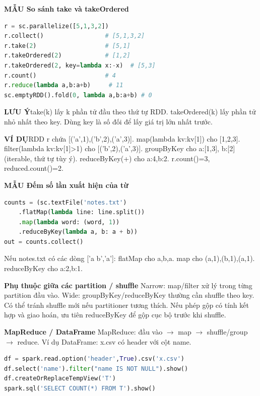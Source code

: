 \documentclass[a4paper]{article}
\newcommand{\bodyfontsize}{5.55}
\newcommand{\bodyleading}{5.2}
\newcommand{\bodylineskiplimit}{-2pt}
\newcommand{\bodystyle}{%
  \fontsize{\bodyfontsize}{\bodyleading}\selectfont\setlength{\lineskiplimit}{\bodylineskiplimit}\RaggedRight
  \setlength{\abovedisplayskip}{.5pt}\setlength{\belowdisplayskip}{.5pt}%
  \setlength{\abovedisplayshortskip}{.3pt}\setlength{\belowdisplayshortskip}{.3pt}}
\newenvironment{topicblock}
  {\par\bodystyle}
  {\par}
\newcommand{\key}[1]{\par\textcolor{structure}{\textbf{#1}}\enspace}
\newcommand{\note}[4]{\par\nointerlineskip\vspace{.25pt}\begingroup\setlength{\fboxsep}{0.1pt}%
  \noindent\colorbox{#1}{\parbox{\dimexpr\linewidth-2\fboxsep\relax}{%
    \RaggedRight\textcolor{#2}{\textbf{#3}}\enspace #4}}%
  \endgroup\par\nointerlineskip\vspace{.25pt}}
\newcommand{\trap}[1]{\note{warningbg}{warning}{LƯU Ý}{#1}}
\newcommand{\ex}[1]{\note{examplebg}{example}{VÍ DỤ}{#1}}
\newcommand{\pattern}[1]{\key{MẪU #1}}
\newlength{\sheetwidth}
\newenvironment{sheetcolumns}[1]
  {\noindent\begin{minipage}[t]{#1\sheetwidth}\vspace{0pt}\bodystyle\ignorespaces}
  {\end{minipage}\par}
\begin{document}
\begin{sheetcolumns}{.272}
\begin{topicblock}
\pattern{So sánh take và takeOrdered}
\begin{lstlisting}[style=Plaincode,language=Python]
r = sc.parallelize([5,1,3,2])
r.collect()                 # [5,1,3,2]
r.take(2)                   # [5,1]
r.takeOrdered(2)            # [1,2]
r.takeOrdered(2, key=lambda x:-x)  # [5,3]
r.count()                   # 4
r.reduce(lambda a,b:a+b)     # 11
sc.emptyRDD().fold(0, lambda a,b:a+b) # 0
\end{lstlisting}
\trap{take(k) lấy k phần tử đầu theo thứ tự RDD. takeOrdered(k) lấy phần tử nhỏ nhất theo key. Dùng key là số đối để lấy giá trị lớn nhất trước.}
\ex{RDD r chứa [('a',1),('b',2),('a',3)]. map(lambda kv:kv[1]) cho [1,2,3]. filter(lambda kv:kv[1]>1) cho [('b',2),('a',3)]. groupByKey cho a:[1,3], b:[2] (iterable, thứ tự tùy ý). reduceByKey(+) cho a:4,b:2. r.count()=3, reduced.count()=2.}
\pattern{Đếm số lần xuất hiện của từ}
\begin{lstlisting}[style=Plaincode,language=Python]
counts = (sc.textFile('notes.txt')
    .flatMap(lambda line: line.split())
    .map(lambda word: (word, 1))
    .reduceByKey(lambda a, b: a + b))
out = counts.collect()
\end{lstlisting}
Nếu notes.txt có các dòng ['a b','a']: flatMap cho a,b,a. map cho (a,1),(b,1),(a,1). reduceByKey cho a:2,b:1.
\key{Phụ thuộc giữa các partition / shuffle}
Narrow: map/filter xử lý trong từng partition đầu vào. Wide: groupByKey/reduceByKey thường cần shuffle theo key. Có thể tránh shuffle mới nếu partitioner tương thích. Nếu phép gộp có tính kết hợp và giao hoán, ưu tiên reduceByKey để gộp cục bộ trước khi shuffle.
\key{MapReduce / DataFrame}
MapReduce: đầu vào $\to$ map $\to$ shuffle/group $\to$ reduce. Ví dụ DataFrame: x.csv có header với cột name.
\begin{lstlisting}[style=Plaincode,language=Python]
df = spark.read.option('header',True).csv('x.csv')
df.select('name').filter("name IS NOT NULL").show()
df.createOrReplaceTempView('T')
spark.sql('SELECT COUNT(*) FROM T').show()
\end{lstlisting}
\end{topicblock}
\end{sheetcolumns}
\end{document}
